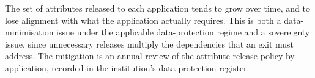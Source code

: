 \begin{pitfallbox}
\noindent The set of attributes released to each application tends to
grow over time, and to lose alignment with what the application
actually requires. This is both a data-minimisation issue under the
applicable data-protection regime and a sovereignty issue, since unnecessary releases
multiply the dependencies that an exit must address. The mitigation
is an annual review of the attribute-release policy by application,
recorded in the institution's data-protection register.
\end{pitfallbox}
